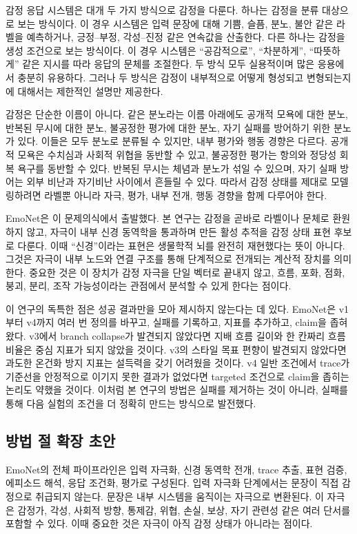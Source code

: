 \documentclass[11pt,a4paper]{article}
\begin{document}
감정 응답 시스템은 대개 두 가지 방식으로 감정을 다룬다. 하나는 감정을 분류 대상으로 보는 방식이다. 이 경우 시스템은 입력 문장에 대해 기쁨, 슬픔, 분노, 불안 같은 라벨을 예측하거나, 긍정--부정, 각성--진정 같은 연속값을 산출한다. 다른 하나는 감정을 생성 조건으로 보는 방식이다. 이 경우 시스템은 ``공감적으로'', ``차분하게'', ``따뜻하게'' 같은 지시를 따라 응답의 문체를 조절한다. 두 방식 모두 실용적이며 많은 응용에서 충분히 유용하다. 그러나 두 방식은 감정이 내부적으로 어떻게 형성되고 변형되는지에 대해서는 제한적인 설명만 제공한다.

감정은 단순한 이름이 아니다. 같은 분노라는 이름 아래에도 공개적 모욕에 대한 분노, 반복된 무시에 대한 분노, 불공정한 평가에 대한 분노, 자기 실패를 방어하기 위한 분노가 있다. 이들은 모두 분노로 분류될 수 있지만, 내부 평가와 행동 경향은 다르다. 공개적 모욕은 수치심과 사회적 위협을 동반할 수 있고, 불공정한 평가는 항의와 정당성 회복 욕구를 동반할 수 있다. 반복된 무시는 체념과 분노가 섞일 수 있으며, 자기 실패 방어는 외부 비난과 자기비난 사이에서 흔들릴 수 있다. 따라서 감정 상태를 제대로 모델링하려면 라벨뿐 아니라 자극, 평가, 내부 전개, 행동 경향을 함께 다루어야 한다.

EmoNet은 이 문제의식에서 출발했다. 본 연구는 감정을 곧바로 라벨이나 문체로 환원하지 않고, 자극이 내부 신경 동역학을 통과하며 만든 활성 추적을 감정 상태 표현 후보로 다룬다. 이때 ``신경''이라는 표현은 생물학적 뇌를 완전히 재현했다는 뜻이 아니다. 그것은 자극이 내부 노드와 연결 구조를 통해 단계적으로 전개되는 계산적 장치를 의미한다. 중요한 것은 이 장치가 감정 자극을 단일 벡터로 끝내지 않고, 흐름, 포화, 점화, 붕괴, 분리, 조작 가능성이라는 관점에서 분석할 수 있게 한다는 점이다.

이 연구의 독특한 점은 성공 결과만을 모아 제시하지 않는다는 데 있다. EmoNet은 v1부터 v4까지 여러 번 정의를 바꾸고, 실패를 기록하고, 지표를 추가하고, claim을 좁혀 왔다. v3에서 branch collapse가 발견되지 않았다면 지배 흐름 길이와 한 칸짜리 흐름 비율은 중심 지표가 되지 않았을 것이다. v3의 스타일 목표 편향이 발견되지 않았다면 과도한 온건화 방지 지표는 설득력을 갖기 어려웠을 것이다. v4 일반 조건에서 trace가 기준선을 안정적으로 이기지 못한 결과가 없었다면 targeted 조건으로 claim을 좁히는 논리도 약했을 것이다. 이처럼 본 연구의 방법은 실패를 제거하는 것이 아니라, 실패를 통해 다음 실험의 조건을 더 정확히 만드는 방식으로 발전했다.

\subsection{방법 절 확장 초안}

EmoNet의 전체 파이프라인은 입력 자극화, 신경 동역학 전개, trace 추출, 표현 검증, 에피소드 해석, 응답 조건화, 평가로 구성된다. 입력 자극화 단계에서는 문장이 직접 감정으로 취급되지 않는다. 문장은 내부 시스템을 움직이는 자극으로 변환된다. 이 자극은 감정가, 각성, 사회적 방향, 통제감, 위협, 손실, 보상, 자기 관련성 같은 여러 단서를 포함할 수 있다. 이때 중요한 것은 자극이 아직 감정 상태가 아니라는 점이다.
\end{document}
